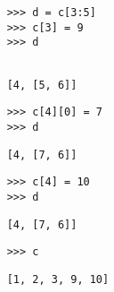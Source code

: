     \begin{blocksection}
    
    \begin{lstlisting}
    >>> d = c[3:5]
    >>> c[3] = 9
    >>> d
    
    \end{lstlisting}
    \begin{solution}[.25in]
    \begin{lstlisting}
    [4, [5, 6]]
    \end{lstlisting}
    \end{solution}
    
    \begin{lstlisting}
    >>> c[4][0] = 7
    >>> d
    \end{lstlisting}
    \begin{solution}[.25in]
    \begin{lstlisting}
    [4, [7, 6]]
    \end{lstlisting}
    \end{solution}
    
    \begin{lstlisting}
    >>> c[4] = 10
    >>> d
    \end{lstlisting}
    \begin{solution}[.25in]
    \begin{lstlisting}
    [4, [7, 6]]
    \end{lstlisting}
    \end{solution}
    
    \begin{lstlisting}
    >>> c
    \end{lstlisting}
    \begin{solution}[.25in]
    \begin{lstlisting}
    [1, 2, 3, 9, 10]
    \end{lstlisting}
    \end{solution}
    
    \end{blocksection}
    
